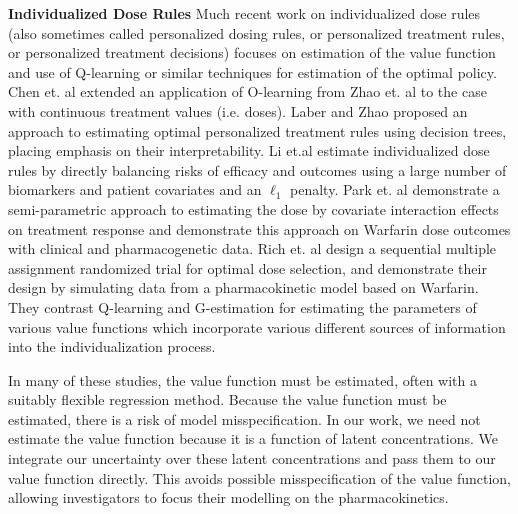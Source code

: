 \textbf{Individualized Dose Rules} Much recent work on individualized dose rules (also sometimes called personalized dosing rules, or personalized treatment rules, or personalized treatment decisions) focuses on estimation of the value function and use of Q-learning or similar techniques for estimation of the optimal policy. Chen et. al \cite{chen2016personalized} extended an application of O-learning from Zhao et. al \cite{zhao2012estimating} to the case with continuous treatment values (i.e. doses).  Laber and Zhao \cite{laber2015tree} proposed an approach to estimating optimal personalized treatment rules using decision trees, placing emphasis on their interpretability. Li et.al \cite{li2020utility} estimate individualized dose rules by directly balancing risks of efficacy and outcomes using a large number of biomarkers and patient covariates and an $\ell_1$ penalty. Park et. al \cite{park2021single} demonstrate a semi-parametric approach to estimating the dose by covariate interaction effects on treatment response and demonstrate this approach on Warfarin dose outcomes with clinical and pharmacogenetic data.  Rich et. al \cite{rich2014simulating} design a sequential multiple assignment randomized trial for optimal dose selection, and demonstrate their design by simulating data from a pharmacokinetic model based on Warfarin. They contrast Q-learning and G-estimation for estimating the parameters of various value functions which incorporate various different sources of information into the individualization process.

In many of these studies, the value function must be estimated, often with a suitably flexible regression method.  Because the value function must be estimated, there is a risk of model misspecification.  In our work, we need not estimate the value function because it is a function of latent concentrations.  We integrate our uncertainty over these latent concentrations and pass them to our value function directly.  This avoids possible misspecification of the value function, allowing investigators to focus their modelling on the pharmacokinetics.
